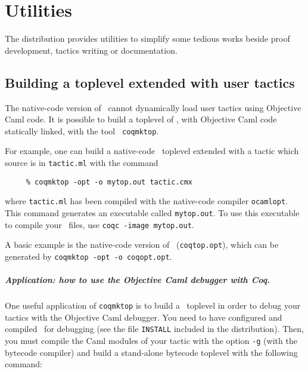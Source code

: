 \chapter[Utilities]{Utilities\label{Utilities}}

The distribution provides utilities to simplify some tedious works
beside proof development, tactics writing or documentation.

\section[Building a toplevel extended with user tactics]{Building a toplevel extended with user tactics\label{Coqmktop}}

The native-code version of \Coq\ cannot dynamically load user tactics
using Objective Caml code. It is possible to build a toplevel of \Coq,
with Objective Caml code statically linked, with the tool {\tt
  coqmktop}.

For example, one can build a native-code \Coq\ toplevel extended with a tactic
which source is in {\tt tactic.ml} with the command 
\begin{verbatim}
     % coqmktop -opt -o mytop.out tactic.cmx
\end{verbatim}
where {\tt tactic.ml} has been compiled with the native-code
compiler {\tt ocamlopt}. This command generates an executable
called {\tt mytop.out}. To use this executable to compile your \Coq\
files, use {\tt coqc -image mytop.out}.

A basic example is the native-code version of \Coq\ ({\tt coqtop.opt}),
which can be generated by {\tt coqmktop -opt -o coqopt.opt}.


\paragraph[Application: how to use the Objective Caml debugger with Coq.]{Application: how to use the Objective Caml debugger with Coq.}

One useful application of \texttt{coqmktop} is to build a \Coq\ toplevel in
order to debug your tactics with the Objective Caml debugger.
You need to have configured and compiled \Coq\ for debugging
(see the file \texttt{INSTALL} included in the distribution).
Then, you must compile the Caml modules of your tactic with the
option \texttt{-g} (with the bytecode compiler) and build a stand-alone
bytecode toplevel with the following command:

